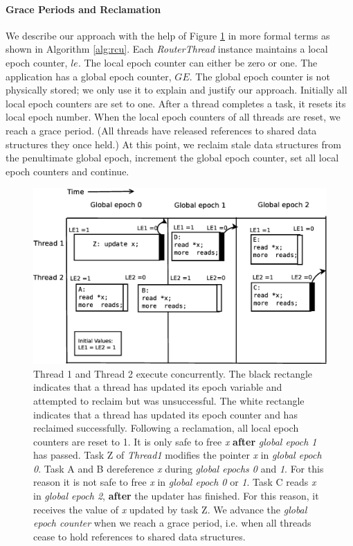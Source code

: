 \documentclass[a4paper,marginparwidth=50pt,marginparsep=10pt]{article}
\begin{document}
\paragraph{Grace Periods and Reclamation}
We describe our approach with the help of Figure \ref{fig:rcuexp2} in more formal terms as shown in Algorithm \ref{alg:rcu}. Each \emph{RouterThread} instance maintains a local epoch counter, $le$. The local epoch counter can either be zero or one. The application has a global epoch counter, $GE$. The global epoch counter is not physically stored; we only use it to explain and justify our approach. Initially all local epoch counters are set to one. After a thread completes a task, it resets its local epoch number. When the local epoch counters of all threads are reset, we reach a grace period. (All threads have released references to shared data structures they once held.) At this point, we reclaim stale data structures from the penultimate global epoch, increment the global epoch counter, set all local epoch counters and continue.
\begin{figure}[float=tph]
\begin{center}
\includegraphics[scale=0.36]{../images/diagrams/rcuexp2}
\caption{Thread 1 and Thread 2 execute concurrently. 
The black rectangle indicates that a thread has updated its epoch variable and attempted to reclaim but was unsuccessful. The white rectangle indicates that a thread has updated its epoch counter and has reclaimed successfully. Following a reclamation, all local epoch counters are reset to 1. 
It is only safe to free \emph{x}  \textbf{after} \emph{global epoch 1} has passed. Task Z of \emph{Thread1} modifies the pointer \emph{x} in \emph{global epoch 0}. Task A and B dereference \emph{x} during \emph{global epochs 0} and \emph{1}. For this reason it is not safe to free \emph{x} in \emph{global epoch 0} or \emph{1}. Task C reads \emph{x} in \emph{global epoch 2}, \textbf{after} the updater has finished. For this reason, it receives the value of \emph{x} updated by task Z. We advance the \emph{global epoch counter} when we reach a grace period, i.e. when all threads cease to hold references to shared data structures.}
\label{fig:rcuexp2}
\end{center}
\end{figure}
\end{document}
